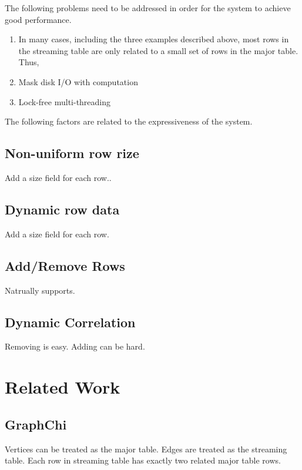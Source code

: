 \documentclass[10pt, twocolumn, a4paper]{article}
\begin{document}
The following problems need to be addressed in order for the system to achieve good performance.

\begin{enumerate}
\item In many cases, including the three examples described above, most rows in the streaming table are only related to a small set of rows in the major table. Thus, 

\item Mask disk I/O with computation

\item Lock-free multi-threading

\end{enumerate}

The following factors are related to the expressiveness of the system.

\subsection{Non-uniform row rize}

Add a size field for each row..

\subsection{Dynamic row data}

Add a size field for each row.

\subsection{Add/Remove Rows}

Natrually supports.

\subsection{Dynamic Correlation}

Removing is easy. Adding can be hard.

\section{Related Work}
\label{sec:related}

\subsection{GraphChi}
Vertices can be treated as the major table. Edges are treated as the streaming table. Each row in streaming table has exactly two related major table rows.
\end{document}
